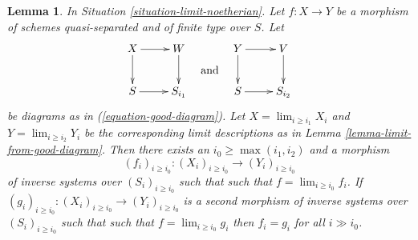 \documentclass{amsart}
\theoremstyle{plain}
\newtheorem{lemma}[subsection]{Lemma}
\theoremstyle{definition}
\theoremstyle{remark}
\numberwithin{equation}{subsection}
\def\lim{\mathop{\mathrm{lim}}\nolimits}
\begin{document}
\begin{lemma}
\label{lemma-morphism-good-diagram}
In Situation \ref{situation-limit-noetherian}.
Let $f : X \to Y$ be a morphism of schemes quasi-separated
and of finite type over $S$. Let
$$
\vcenter{
\xymatrix{
X \ar[r] \ar[d] & W \ar[d] \\
S \ar[r] & S_{i_1}
}
}
\quad\text{and}\quad
\vcenter{
\xymatrix{
Y \ar[r] \ar[d] & V \ar[d] \\
S \ar[r] & S_{i_2}
}
}
$$
be diagrams as in (\ref{equation-good-diagram}). Let
$X = \lim_{i \geq i_1} X_i$ and
$Y = \lim_{i \geq i_2} Y_i$ be the corresponding
limit descriptions as in Lemma \ref{lemma-limit-from-good-diagram}.
Then there exists an $i_0 \geq \max(i_1, i_2)$ and a morphism
$$
(f_i)_{i \geq i_0} : (X_i)_{i \geq i_0} \to (Y_i)_{i \geq i_0}
$$
of inverse systems over $(S_i)_{i \geq i_0}$ such that
such that $f = \lim_{i \geq i_0} f_i$.
If $(g_i)_{i \geq i_0} : (X_i)_{i \geq i_0} \to (Y_i)_{i \geq i_0}$
is a second morphism of inverse systems over $(S_i)_{i \geq i_0}$ such that
such that $f = \lim_{i \geq i_0} g_i$
then $f_i = g_i$ for all $i \gg i_0$.
\end{lemma}
\end{document}
